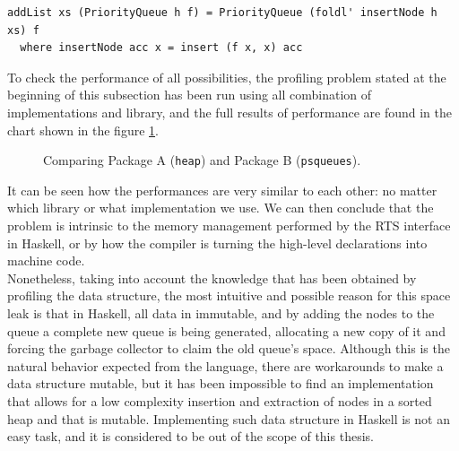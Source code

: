 \begin{lstlisting}[style=haskell, caption= \texttt{addList} using
  \texttt{fold'}, label=addlist:fold]
addList xs (PriorityQueue h f) = PriorityQueue (foldl' insertNode h xs) f
  where insertNode acc x = insert (f x, x) acc
\end{lstlisting}

To check the performance of all possibilities, the profiling problem stated at
the beginning of this subsection has been run using all combination of
implementations and library, and the full results of performance are found in
the chart shown in the figure \ref{chart-libraries}.\\

\begin{figure}[ht]
  \centering
{}
\vspace{-1cm}
\caption{Comparing Package A (\texttt{heap}) and Package B
  (\texttt{psqueues}).}
\label{chart-libraries}
\end{figure}

It can be seen how the performances are very similar to each other: no matter
which library or what implementation we use. We can then conclude that the
problem is intrinsic to the memory management performed by the RTS interface in
Haskell, or by how the compiler is turning the high-level declarations into
machine code.\\

Nonetheless, taking into account the knowledge that has been obtained by
profiling the data structure, the most intuitive and possible reason for this
space leak is that in Haskell, all data in immutable, and by adding the nodes
to the queue a complete new queue is being generated, allocating a new copy of
it and forcing the garbage collector to claim the old queue's space. Although
this is the natural behavior expected from the language, there are workarounds
to make a data structure mutable, but it has been impossible to find an
implementation that allows for a low complexity insertion and extraction of
nodes in a sorted heap and that is mutable. Implementing such data structure in
Haskell is not an easy task, and it is considered to be out of the scope of
this thesis.\\

\newpage

